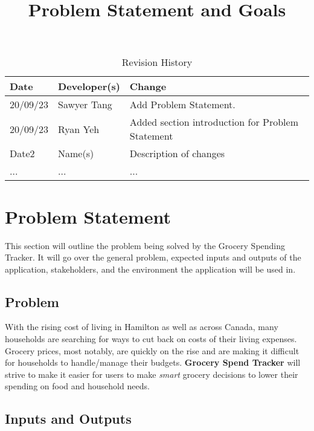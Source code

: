 \documentclass{article}
\title{Problem Statement and Goals\\\progname}
\author{\authname}
\date{}
\begin{document}
\maketitle

\begin{table}[hp]
\caption{Revision History} \label{TblRevisionHistory}
\begin{tabularx}{\textwidth}{llX}
\toprule
\textbf{Date} & \textbf{Developer(s)} & \textbf{Change}\\
\midrule
20/09/23 & Sawyer Tang & Add Problem Statement.\\
20/09/23 & Ryan Yeh & Added section introduction for Problem Statement\\
Date2 & Name(s) & Description of changes\\
... & ... & ...\\
\bottomrule
\end{tabularx}
\end{table}

\section{Problem Statement}


This section will outline the problem being solved by the Grocery Spending Tracker. It will go
over the general problem, expected inputs and outputs of the application, stakeholders, and the environment
the application will be used in.

\subsection{Problem}

With the rising cost of living in Hamilton as well as across Canada, many households are searching for ways to cut back on costs of their living expenses. Grocery prices, most notably, are quickly on the rise and are making it difficult for households to handle/manage their budgets. \textbf{Grocery Spend Tracker} will strive to make it easier for users to make \textit{smart} grocery decisions to lower their spending on food and household needs.

\subsection{Inputs and Outputs}
\end{document}
